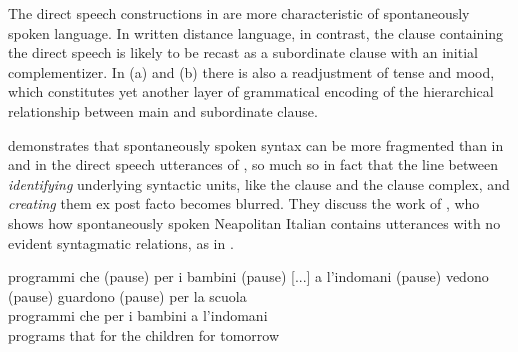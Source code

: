 \begin{table}
\caption{Complement clause embedding (from \citealt[54]{MillerWeinert1998})}
\label{extab:4:5}
\end{table}

\noindent The direct speech constructions in  are more characteristic of spontaneously spoken language. In written distance language, in contrast, the clause containing the direct speech is likely to be recast as a subordinate clause with an initial complementizer. In (a) and (b) there is also a readjustment of tense and mood, which constitutes yet another layer of grammatical encoding of the hierarchical relationship between main and subordinate clause.

\citet[58--71]{MillerWeinert1998} demonstrates that spontaneously spoken syntax can be more fragmented than in  and in the direct speech utterances of , so much so in fact that the line between \textit{identifying} underlying syntactic units, like the clause and the clause complex, and \textit{creating} them ex post facto becomes blurred. They discuss the work of \citet[20--34]{Sornicola1981}, who shows how spontaneously spoken Neapolitan Italian contains utterances with no evident syntagmatic relations, as in .

\ea%
    \label{ex:4:6}
    programmi che (pause) per i bambini (pause) [...] a l'indomani (pause) vedono (pause) guardono (pause) per la scuola \\
\gll        programmi   che  per   i   bambini     a l’indomani \\
  programs   that  for  the   children                     for tomorrow\\

